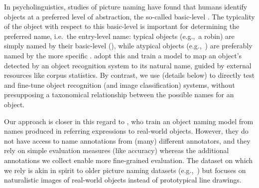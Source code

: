 
%
In psycholinguistics, studies of picture naming have found that humans identify objects at a preferred level of abstraction, the so-called basic-level \cite{rosch1976basic,jolicoeur1984pictures}. 
The typicality of the object with respect to this basic-level is important for determining the preferred name, i.e.\ the entry-level name: typical objects (e.g.,\ a robin) are simply named by their basic-level \category (), while atypical objects (e.g.,\ ) are preferably named by the more specific \category.
 adopt this and train a model to map an object's \category detected by an object recognition system to its natural name, guided by external resources like corpus statistics.
By contrast, we use \mn (details below) to directly test and fine-tune object recognition (and image classification) systems, without presupposing a taxonomical relationship between the possible names for an object.

Our approach is closer in this regard to , who train an object naming model from names produced in referring expressions to real-world objects.
However, they do not have access to name annotations from (many) different annotators, and they rely on simple evaluation measures (like accuracy) whereas the additional annotations we collect enable more fine-grained evaluation.
The \mn dataset on which we rely is akin in spirit to older picture naming datasets (e.g.,~) but focuses on naturalistic images of real-world objects instead of prototypical line drawings.

